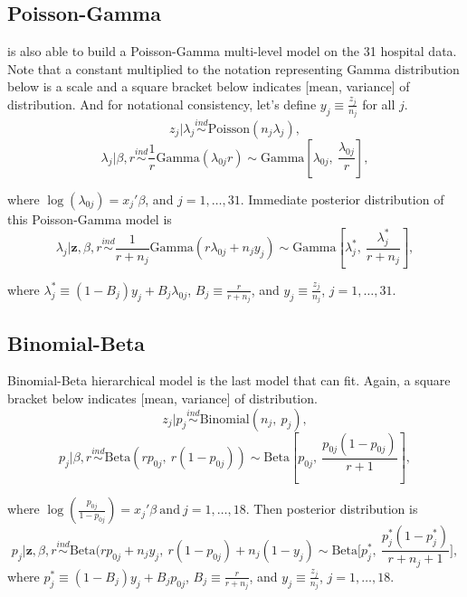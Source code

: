 \documentclass[article]{jss}
\begin{document}
\subsection[Poisson-Gamma]{Poisson-Gamma}
 is also able to build a Poisson-Gamma multi-level model on the 31 hospital data. Note that a constant multiplied to the notation representing Gamma distribution below is a scale and a square bracket below indicates [mean, variance] of distribution. And for notational consistency, let's define $y_{j}\equiv \frac{z_{j}}{n_{j}}$ for all $j$.
\begin{equation}
z_{j}\vert \lambda_{j} \stackrel{ind}{\sim}\textrm{Poisson}(n_{j}\lambda_{j}),
\end{equation}
\begin{equation}
\lambda_{j}\vert \beta, r\stackrel{ind}{\sim}\frac{1}{r}\textrm{Gamma}(\lambda_{0j}r)\sim \textrm{Gamma}[\lambda_{0j}, ~\frac{\lambda_{0j}}{r}],
\end{equation}

where $\log(\lambda_{0j}) =x_{j}'\beta$, and $j=1, \ldots, 31$. Immediate posterior distribution of this Poisson-Gamma model is
\begin{equation}
\lambda_{j}\vert \textbf{z}, \beta, r \stackrel{ind}{\sim}\frac{1}{r + n_{j}}\textrm{Gamma}(r\lambda_{0j} + n_{j}y_{j})\sim\textrm{Gamma}[\lambda^{\ast}_{j},~\frac{\lambda^{\ast}_{j}}{r+n_{j}}],
\end{equation}

where $\lambda^{\ast}_{j} \equiv (1-B_{j})y_{j} + B_{j}\lambda_{0j}$,  $B_{j}\equiv \frac{r}{r+n_{j}}$, and $y_{j}\equiv \frac{z_{j}}{n_{j}}$, $j=1, \ldots, 31$. 

\subsection[Binomial-Beta]{Binomial-Beta}
Binomial-Beta hierarchical model is the last model that  can fit. Again, a square bracket below indicates [mean, variance] of distribution.
\begin{equation}
z_{j} \vert p_{j}\stackrel{ind}{\sim}\textrm{Binomial}(n_{j}, ~p_{j}),
\end{equation}
\begin{equation}
p_{j} \vert \beta, r\stackrel{ind}{\sim}\textrm{Beta}(rp_{0j},~ r(1-p_{0j}))\sim \textrm{Beta}[p_{0j}, ~\frac{p_{0j}(1-p_{0j})}{r + 1}],
\end{equation}

where $\log(\frac{p_{0j}}{1-p_{0j}}) =x_{j}'\beta~\textrm{and}~j=1, \ldots, 18$. Then posterior distribution is
\begin{equation}
p_{j}\vert \textbf{z}, \beta, r \stackrel{ind}{\sim}\textrm{Beta}(rp_{0j}+n_{j}y_{j},~r(1-p_{0j})+n_{j}(1-y_{j})\sim\textrm{Beta}\bigg[p^{\ast}_{j},~ \frac{p^{\ast}_{j}(1-p^{\ast}_{j})}{r+n_{j}+1}\bigg],
\end{equation}
where $p^{\ast}_{j}\equiv(1-B_{j})y_{j}+B_{j}p_{0j}$, $B_{j}\equiv\frac{r}{r+n_{j}}$, and $y_{j}\equiv\frac{z_{j}}{n_{j}}$, $j=1,\ldots,18$.
\end{document}
